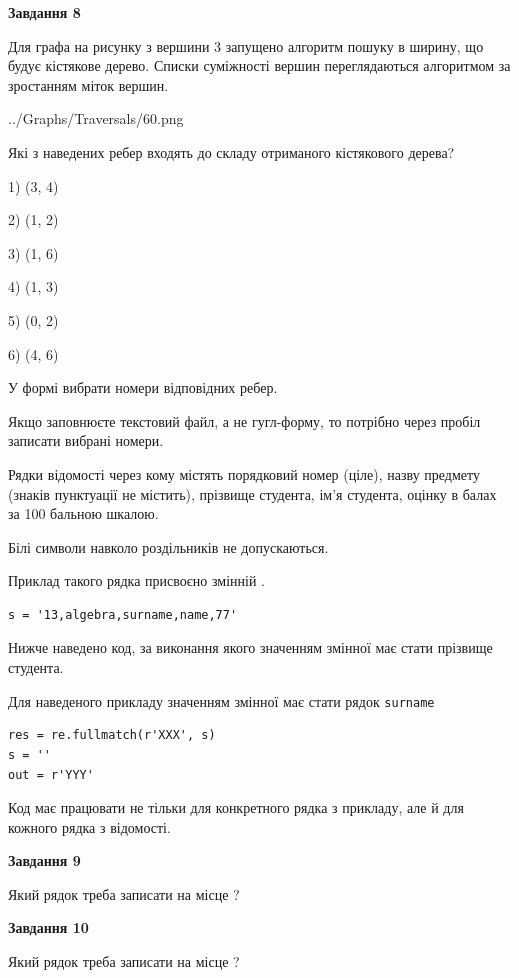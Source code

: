 \documentclass[12pt, ukrainian]{article}
\def\code#1{\Verb!#1!}
\begin{document}
{\begin {large}
{\begin {center}\textbf{Завдання 8}\end {center}}\par
Для графа на рисунку з вершини 3 запущено алгоритм пошуку в ширину, що будує кістякове дерево. Списки суміжності вершин переглядаються алгоритмом за зростанням міток вершин.\par
\begin{center}
	{../Graphs/Traversals/60.png}
\end{center}
\par Які з наведених ребер входять до складу отриманого кістякового дерева?\par
1) (3, 4)\par
2) (1, 2)\par
3) (1, 6)\par
4) (1, 3)\par
5) (0, 2)\par
6) (4, 6)\par
{\vskip 15pt} У формі вибрати номери відповідних ребер.


Якщо заповнюєте текстовий файл, а не гугл-форму, то потрібно через пробіл записа\-ти вибрані номери.\par
\newpage


Рядки відомості через кому містять порядковий номер (ціле), назву предмету (зна\-ків пунктуації не містить), прізвище студента, ім'я студента, оцінку в балах за 100 бальною шкалою.

Білі символи навколо роздільників не допускаються.

Приклад такого рядка присвоєно змінній .



\begin{verbatim}
s = '13,algebra,surname,name,77'
\end{verbatim}


Нижче наведено код, за виконання якого значенням змінної  має стати прізвище студента.

Для наведеного прикладу значенням змінної  має стати рядок \code{surname}



\begin{verbatim}
res = re.fullmatch(r'XXX', s)
s = ''
out = r'YYY'
\end{verbatim}


Код має працювати не тільки для конкретного рядка з прикладу, але й для кожного рядка з відомості.

{\begin {center}\textbf{Завдання 9}\end {center}}\par
Який рядок треба записати на місце  ?\par
\vspace{5mm}


{\begin {center}\textbf{Завдання 10}\end {center}}\par
Який рядок треба записати на місце  ?\par


\newpage


\end {large}}
\end{document}
